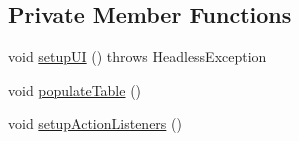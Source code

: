 \subsection*{Private Member Functions}
\begin{DoxyCompactItemize}
\item 
void \mbox{\hyperlink{classcom_1_1activitytracker_1_1_main_window_a53a019623a37b950473359fc625b6423}{setup\+UI}} ()  throws Headless\+Exception 
\item 
void \mbox{\hyperlink{classcom_1_1activitytracker_1_1_main_window_ae3955dd50087d95257d029b9c67ac185}{populate\+Table}} ()
\item 
void \mbox{\hyperlink{classcom_1_1activitytracker_1_1_main_window_a76b3e8567b228ccd26f09c15ebaddb72}{setup\+Action\+Listeners}} ()
\end{DoxyCompactItemize}
